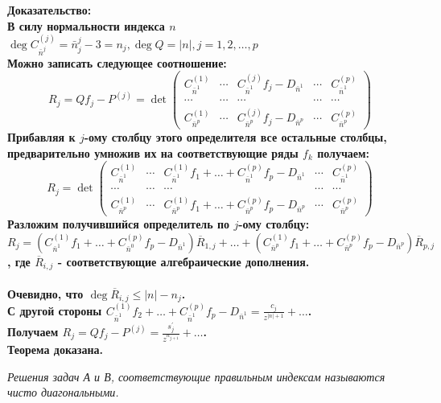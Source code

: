 \bf Доказательство: \rm \\
В силу нормальности индекса $n$ $\deg  C^{(j)}_{\bar{n}^{j}} =
\bar{n}_j^{j}-3 = n_j, \deg  Q = |n|, j=1,2,\ldots,p$\\
Можно записать следующее соотношение:
$$%
R_j=Qf_j-P^{(j)} = \det \left(
\begin{array}{cccccccccccccc}
C^{(1)}_{\bar{n}^{1}} & \cdots &
C^{(j)}_{\bar{n}^{1}}f_j-D_{{\bar{n}^{1}}} & \cdots &
C^{(p)}_{\bar{n}^{1}}
\\
\cdots & \cdots & \cdots & \cdots & \cdots\\
C^{(1)}_{\bar{n}^{p}} & \cdots &
C^{(j)}_{\bar{n}^{p}}f_j-D_{{\bar{n}^{p}}} & \cdots &
C^{(p)}_{\bar{n}^{p}}
\end{array}
\right)
$$%
Прибавляя к $j$-ому столбцу этого определителя все остальные
столбцы, предварительно умножив их на соответствующие ряды $f_k$
получаем:
$$%
R_j=  \det \left(
\begin{array}{cccccccccccccc}
C^{(1)}_{\bar{n}^{1}} & \cdots &
C^{(1)}_{\bar{n}^{1}}f_1+\ldots+C^{(p)}_{\bar{n}^{1}}f_p-D_{{\bar{n}^{1}}}
& \cdots & C^{(p)}_{\bar{n}^{1}}
\\
\cdots & \cdots & \cdots & \cdots & \cdots\\
C^{(1)}_{\bar{n}^{p}} & \cdots &
C^{(1)}_{\bar{n}^{p}}f_1+\ldots+C^{(p)}_{\bar{n}^{p}}f_p-D_{{\bar{n}^{p}}}
& \cdots & C^{(p)}_{\bar{n}^{p}}
\end{array}
\right)
$$%
Разложим получившийся определитель по $j$-ому столбцу:
$$%
R_j=
(C^{(1)}_{\bar{n}^{1}}f_1+\ldots+C^{(p)}_{\bar{n}^{0}}f_p-D_{{\bar{n}^{1}}})
\overline{R}_{1,j}+\ldots+(C^{(1)}_{\bar{n}^{p}}f_1+\ldots+C^{(p)}_{\bar{n}^{p}}f_p-D_{{\bar{n}^{p}}})\overline{R}_{p,j}
$$%
, где $\overline{R}_{i,j}$ - соответствующие
алгебраические
дополнения. \\ \\
Очевидно, что $\deg  \overline{R}_{i,j} \leq |n|-n_j$.\\
С другой стороны
$C^{(1)}_{\bar{n}^{1}}f_2+\ldots+C^{(p)}_{\bar{n}^{1}}f_p-D_{{\bar{n}^{1}}}
= \displaystyle\frac {c_j}{z^{|n|+1}}+\ldots$. \\
Получаем $R_j=Qf_j-P^{(j)} = \displaystyle\frac {s_j^{'}}
{z^{n_{j+1}}} +\ldots$. \\
Теорема доказана. \\
\begin{defi}
\it Решения задач А и В, соответствующие правильным индексам
называются чисто диагональными. \rm \\
\end{defi}
